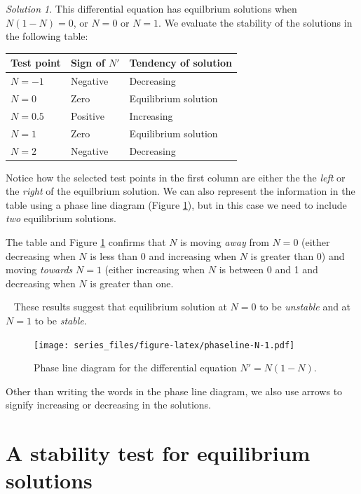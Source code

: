 \documentclass[
]{book}
\theoremstyle{definition}
\theoremstyle{definition}
\theoremstyle{definition}
\theoremstyle{remark}
\newtheorem*{solution}{Solution}
\begin{document}
\begin{solution}
{}This differential equation has equilbrium solutions when \(N(1-N)=0\), or \(N=0\) or \(N=1\). We evaluate the stability of the solutions in the following table:

\begin{longtable}[]{@{}lll@{}}
\toprule
\textbf{Test point} & \textbf{Sign of \(N'\)} & \textbf{Tendency of solution} \\
\midrule
\endhead
\(N=-1\) & Negative & Decreasing \\
\(N=0\) & Zero & Equilibrium solution \\
\(N=0.5\) & Positive & Increasing \\
\(N=1\) & Zero & Equilibrium solution \\
\(N=2\) & Negative & Decreasing \\
\bottomrule
\end{longtable}

Notice how the selected test points in the first column are either the the \emph{left} or the \emph{right} of the equilbrium solution. We can also represent the information in the table using a phase line diagram (Figure \ref{fig:phaseline-N}), but in this case we need to include \emph{two} equilibrium solutions.

The table and Figure \ref{fig:phaseline-N} confirms that \(N\) is moving \emph{away} from \(N=0\) (either decreasing when \(N\) is less than 0 and increasing when \(N\) is greater than 0) and moving \emph{towards} \(N=1\) (either increasing when \(N\) is between 0 and 1 and decreasing when \(N\) is greater than one.

~
These results suggest that equilibrium solution at \(N=0\) to be \emph{unstable} and at \(N=1\) to be \emph{stable}.
\end{solution}

\begin{figure}
\centering
\texttt{[image: series\_files/figure-latex/phaseline-N-1.pdf]}
\caption{\label{fig:phaseline-N}Phase line diagram for the differential equation \(N'=N(1-N)\).}
\end{figure}

Other than writing the words in the phase line diagram, we also use arrows to signify increasing or decreasing in the solutions.

\hypertarget{a-stability-test-for-equilibrium-solutions}{%
\section{A stability test for equilibrium solutions}\label{a-stability-test-for-equilibrium-solutions}}
\end{document}
